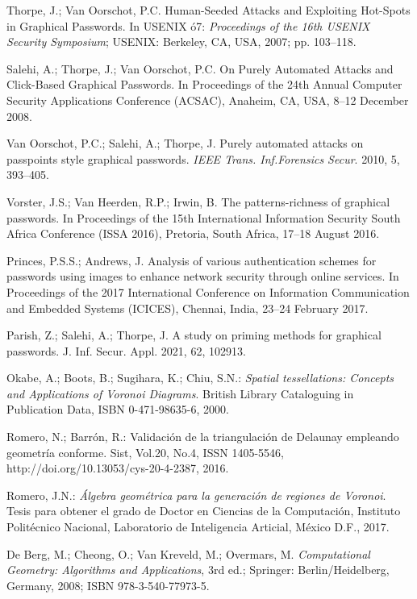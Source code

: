 \documentclass[12pt]{report}
\begin{document}
\begin{thebibliography}{9}
{		Thorpe, J.; Van Oorschot, P.C. Human-Seeded Attacks and Exploiting Hot-Spots in Graphical Passwords. In USENIX ó7: \textit{Proceedings of the 16th USENIX Security Symposium}; USENIX: Berkeley, CA, USA, 2007; pp. 103–118.
		
		Salehi, A.; Thorpe, J.; Van Oorschot, P.C. On Purely Automated Attacks and Click-Based Graphical Passwords. In Proceedings of the 24th Annual Computer Security Applications Conference (ACSAC), Anaheim, CA, USA, 8–12 December 2008.
		
		Van Oorschot, P.C.; Salehi, A.; Thorpe, J. Purely automated attacks on passpoints style graphical passwords.\textit{ IEEE Trans. Inf.Forensics Secur}. 2010, 5, 393–405.
		
		Vorster, J.S.; Van Heerden, R.P.; Irwin, B. The patterns-richness of graphical passwords. In Proceedings of the 15th International Information Security South Africa Conference (ISSA 2016), Pretoria, South Africa, 17–18 August 2016.
		
		Princes, P.S.S.; Andrews, J. Analysis of various authentication schemes for passwords using images to enhance network security through online services. In Proceedings of the 2017 International Conference on Information Communication and Embedded Systems (ICICES), Chennai, India, 23–24 February 2017.
		
		Parish, Z.; Salehi, A.; Thorpe, J. A study on priming methods for graphical passwords. J. Inf. Secur. Appl. 2021, 62, 102913.
		
		Okabe, A.; Boots, B.; Sugihara, K.; Chiu, S.N.: \textit{Spatial tessellations: Concepts and Applications of Voronoi Diagrams}. British Library Cataloguing in Publication Data, ISBN 0-471-98635-6, 2000.
		
		Romero, N.; Barrón, R.: Validación de la triangulación de Delaunay empleando geometría conforme. Sist, Vol.20, No.4, ISSN 1405-5546, http://doi.org/10.13053/cys-20-4-2387, 2016.
		
		Romero, J.N.:  \textit{Álgebra geométrica para la generación de regiones de Voronoi}. Tesis para obtener el grado de Doctor en Ciencias de la Computación, Instituto Politécnico Nacional, Laboratorio de Inteligencia Articial, México D.F., 2017.
		
		De Berg, M.; Cheong, O.; Van Kreveld, M.; Overmars, M. \textit{Computational Geometry: Algorithms and Applications}, 3rd ed.; Springer: Berlin/Heidelberg, Germany, 2008; ISBN 978-3-540-77973-5.
		
}
\end{thebibliography}
\end{document}

